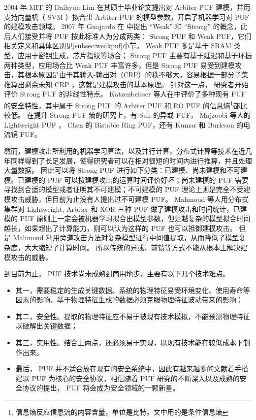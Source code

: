 2004 年 MIT 的 Daihyun Lim 在其硕士毕业论文\supercite{lim2005extracting}提出对 Arbiter-PUF 建模，并用支持向量机（ SVM ）拟合出 Arbiter-PUF 的模型参数，开启了机器学习对 PUF 的建模攻击领域。
2007 年 Guajardo 在 \parencite{Guajardo2007fpga} 中提出 ``Weak'' 和 ``Strong'' 的概念，此后人们接受并将 PUF 按此标准人为分成两类： Strong PUF 和 Weak PUF，它们相关定义和具体区别见\ref{subsec:weakpuf}小节。 Weak PUF 多是基于 SRAM 类型，应用于密钥生成，芯片指纹等场合； Strong PUF 主要有基于延迟和基于环振两种类型，应用场合比 Weak PUF 丰富许多，但是 Strong PUF 易受到建模攻击，其根本原因是由于其输入-输出对（CRP）的秩不够大，容易根据一部分子集推算出剩余未知 CRP ，这就是建模攻击的基本原理。
针对这一点， 研究者开始评价 Strong PUF 的非线性特点。 Katzenbeisser 等人在\parencite{katzenbeisser2012pufs}中评价了多种现有 PUF 的安全特性，其中属于 Strong PUF 的 Arbiter PUF 和 RO PUF 的信息熵\footnote{信息熵反应信息流的内容含量，单位是比特。文中用的是条件信息熵}都比较低。
在提升 Strong PUF 熵的研究上，有 Suh 的异或 PUF\supercite{suh2007physical}， Majzoobi 等人的 Lightweight PUF \supercite{majzoobi2008lightweight}， Chen 的 Bistable Ring PUF\supercite{chen2011bistable}，还有 Kumar 和 Burleson 的电流镜 PUF\supercite{kumar2014design}。

然而，建模攻击所利用的机器学习算法，以及并行计算，分布式计算等技术在近几年同样得到了长足发展，使得研究者可以在相对很短的时间内进行推算，并且处理大量数据。
因此可以将 Strong PUF 进行如下分类：已建模、尚未建模和不可建模。已建模的 PUF 可以按建模攻击的运算时间评价好坏；尚未建模的 PUF 需要寻找到合适的模型或者证明其不可建模；不可建模的 PUF 理论上则是完全不受建模攻击威胁，但目前为止没有人提出过不可建模 PUF。
Mahmoud 等人用分布式集群对 Lightweight, Arbiter 和 XOR 三种 PUF 做了建模攻击和时间统计\supercite{mahmoud2013combined,xu2014hybrid}，已建模的 PUF 原则上一定会被机器学习拟合出模型参数，但是越复杂的模型拟合时间越长，如果超出了计算能力，则可以认为这样的 PUF 也可以抵御建模攻击。
但是 Mahmoud 利用旁道攻击方法对复杂模型进行中间值提取，从而降低了模型复杂度，大大缩短了计算时间。
所以传统的异或、前馈等方式不能从根本上解决建模攻击的威胁。

到目前为止， PUF 技术尚未成熟到商用地步，主要有以下几个技术难点。
\begin{itemize}
\item 其一，需要稳定的生成关键数据。系统的物理特征易受环境变化、使用寿命等因素的影响，基于物理特征生成的数据必须克服物理特征波动带来的影响；
\item 其二，安全性。提取的物理特征应不易于被现有技术模拟，不能预测物理特征以破解出关键数据；
\item 其三，实用性。结合上两点，还必须易于实现，以现有技术能在较低成本下制作出来。
\item 最后， PUF 并不适合放在现有的安全系统中，因此有越来越多的文献着手搭建以 PUF 为核心的安全协议，相信随着 PUF 研究的不断深入以及成熟的安全协议的提出， PUF 将会成为安全领域的一颗新星。
\end{itemize}

